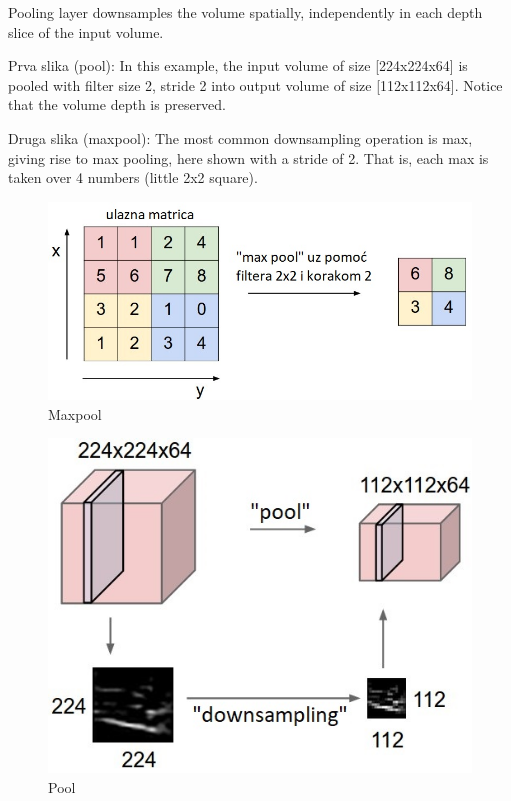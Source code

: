 \documentclass[a4paper]{article}
\begin{document}
 Pooling layer downsamples the volume spatially, independently in each depth slice of the input volume.
 
Prva slika (pool): In this example, the input volume of size [224x224x64] is pooled with filter size 2, stride 2 into output volume of size [112x112x64]. Notice that the volume depth is preserved.
 
Druga slika (maxpool): The most common downsampling operation is max, giving rise to max pooling, here shown with a stride of 2. That is, each max is taken over 4 numbers (little 2x2 square).

 
\begin{figure}[h!]
\begin{center}
\includegraphics[scale=0.4]{maxpool.jpeg}
\end{center}
\caption{Maxpool}
\label{fig:maxpool}
\end{figure}


\begin{figure}[h!]
\begin{center}
\includegraphics[scale=0.4]{pool.jpeg}
\end{center}
\caption{Pool}
\label{fig:pool}
\end{figure}
\end{document}
